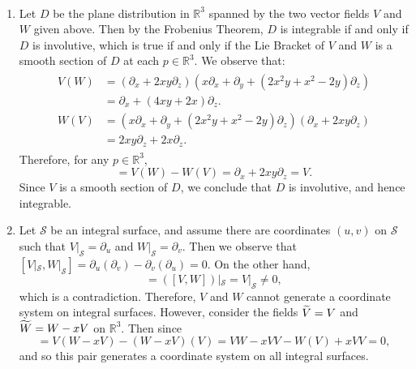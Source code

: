 \documentclass{article}
\begin{document}
\begin{solutions}
	$ $\newline \vspace{-0.65cm}
	\begin{enumerate}[itemsep =-2pt,label = (\roman{*})]
		\item Let $D$ be the plane distribution in $\mathbb{R}^{3}$ spanned by the two vector fields $V$ and $W$ given above. Then by the Frobenius Theorem, $D$ is integrable if and only if $D$ is involutive, which is true if and only if the Lie Bracket of $V$ and $W$ is a smooth section of $D$ at each $p \in \mathbb{R}^{3}$. We observe that: 
		\begin{align}
			\begin{split}
				V(W) &= \left(\partial_{x} + 2xy\partial_{z}\right)(x\partial_{x} + \partial_{y} + (2x^{2}y + x^{2} - 2y)\partial_{z}) \\
				&= \partial_{x} + (4xy + 2x)\partial_{z}. \\
				W(V) &= \left(x\partial_{x} + \partial_{y} + (2x^{2}y + x^{2} - 2y)\partial_{z}\right)(\partial_{x}+ 2xy\partial_{z}) \\
				&= 2xy\partial_{z} + 2x\partial_{z}. 
			\end{split}
		\end{align}
		Therefore, for any $p \in \mathbb{R}^{3}$, 
		\begin{equation}
			[V, W] = V(W) - W(V) = \partial_{x} + 2xy\partial_{z} = V. 
		\end{equation}
		Since $V$ is a smooth section of $D$, we conclude that $D$ is involutive, and hence integrable. 
		\item Let $\mathscr{S}$ be an integral surface, and assume there are coordinates $(u, v)$ on $\mathscr{S}$ such that $V|_{\mathscr{S}} = \partial_{u}$ and $W|_{\mathscr{S}} = \partial_{v}$. Then we observe that $[V|_{\mathscr{S}}, W|_{\mathscr{S}}] = \partial_{u}(\partial_{v}) - \partial_{v}(\partial_{u}) = 0$. On the other hand, 
		\begin{equation}
			[V|_{\mathscr{S}}, W|_{\mathscr{S}}] = ([V, W])|_{\mathscr{S}} = V|_{\mathscr{S}} \neq 0, 
		\end{equation}
		which is a contradiction. Therefore, $V$ and $W$ cannot generate a coordinate system on integral surfaces. However, consider the fields $\widetilde{V} = V$ and $\widetilde{W} = W - xV$ on $\mathbb{R}^{3}$. Then since
		\begin{equation}
			[\ti{V}, \ti{W}] = V(W - xV) - (W - xV)(V) = VW - xVV - W(V) + xVV = 0, 
		\end{equation} 
		and so this pair generates a coordinate system on all integral surfaces. 
	\end{enumerate}
\end{solutions}
\end{document}
